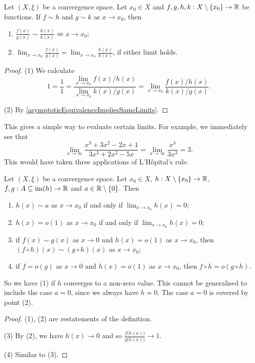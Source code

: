 \begin{proposition} \label{asymptoticEquivalenceQuotient}
Let $(X,\xi)$ be a convergence space. Let $x_0 \in X$ and $f,g,h,k: X\setminus\{x_0\}\to \mathbb{R}$ be functions. If $f \sim h$ and $g\sim k$ as $x\to x_0$, then
\begin{enumerate}
\item $\displaystyle \frac{f(x)}{g(x)} \sim \frac{h(x)}{k(x)}$ as $x\to x_0$;
\item $\displaystyle \lim_{x\to x_0}\frac{f(x)}{g(x)} = \lim_{x\to x_0}\frac{h(x)}{k(x)}$, if either limit holds.
\end{enumerate}
\end{proposition}
\begin{proof}
(1) We calculate
\[ 1 = \frac{1}{1} = \frac{\lim_{x\to x_0}f(x) / h(x)}{\lim_{x\to x_0}k(x) / g(x)} = \lim_{x\to x_0}\frac{f(x) / h(x)}{k(x) / g(x)}.  \]

(2) By \ref{asymptoticEquivalenceImpliesSameLimits}.
\end{proof}
\begin{example}
This gives a simple way to evaluate certain limits. For example, we immediately see that
\[ \lim_{x\to \infty}\frac{x^3 + 3x^2 - 2x +1}{3x^3 + 2x^2 -5x} = \lim_{x\to \infty}\frac{x^3}{3x^3} = 3. \]
This would have taken three applications of L'Hôpital's rule.
\end{example}

\begin{lemma} \label{limitOperationsAsymptoticNotation}
Let $(X,\xi)$ be a convergence space. Let $x_0 \in X$, $h: X\setminus\{x_0\}\to \mathbb{R}$, $f,g: A\subseteq \operatorname{im}(h) \to \mathbb{R}$ and $a\in \mathbb{R}\setminus\{0\}$. Then
\begin{enumerate}
\item $h(x) \sim a$ as $x\to x_0$ \textup{if and only if} $\lim_{x\to x_0}h(x) = 0$;
\item $h(x) = o(1)$ as $x\to x_0$ \textup{if and only if} $\lim_{x\to x_0}h(x) = 0$;
\item if $f(x)\sim g(x)$ as $x\to 0$ and $h(x) = o(1)$ as $x\to x_0$, then $(f\circ h)(x) \sim (g\circ h)(x)$ as $x\to x_0$;
\item if $f = o(g)$ as $x\to 0$ and $h(x) = o(1)$ as $x\to x_0$, then $f\circ h = o(g\circ h)$.
\end{enumerate}
\end{lemma}
So we have (1) if $h$ converges to a non-zero value. This cannot be generalised to include the case $a=0$, since we always have $h \nsim 0$. The case $a=0$ is covered by point (2).
\begin{proof}
(1), (2) are restatements of the definition.

(3) By (2), we have $h(x) \to 0$ and so $\frac{f\big(h(x)\big)}{g\big(h(x)\big)} \to 1$.

(4) Similar to (3).
\end{proof}

